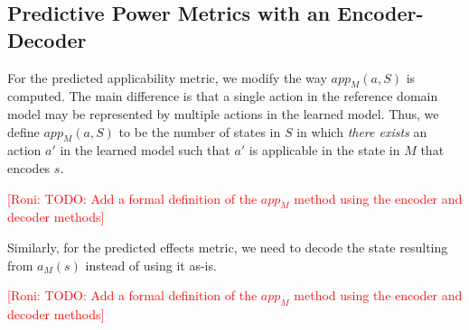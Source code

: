 \documentclass{article}
\theoremstyle{definition}
\theoremstyle{remark}
\newcommand{\app}{\ensuremath{\textit{app}}\xspace}
\newcommand{\roni}[1]{{\textcolor{red}{[Roni: #1]}}}
\begin{document}
    
    





\subsection{Predictive Power Metrics with an Encoder-Decoder}
For the predicted applicability metric, we modify the way $\app_M(a,S)$ is computed. The main difference is that a single action in the reference domain model may be represented by multiple actions in the learned model. 
Thus, we define 
$\app_M(a,S)$ to be the number of states in $S$ in which \emph{there exists} an action $a'$ in the learned model such that $a'$ is applicable in the state in $M$ that encodes $s$. 

\roni{TODO: Add a formal definition of the $app_M$ method using the encoder and decoder methods}

Similarly, for the predicted effects metric, we need to decode the state resulting from $a_M(s)$ instead of using it as-is. 

\roni{TODO: Add a formal definition of the $app_M$ method using the encoder and decoder methods}
\end{document}
